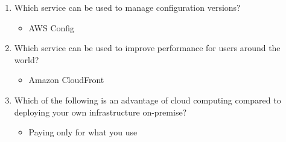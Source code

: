 \begin{enumerate}
	\item Which service can be used to manage configuration versions?

	\begin{itemize}
	\item AWS Config
\end{itemize}

	\item Which service can be used to improve performance for users around the world?

	\begin{itemize}
	\item Amazon CloudFront
\end{itemize}

	\item Which of the following is an advantage of cloud computing compared to deploying your own infrastructure on-premise?

	\begin{itemize}
	\item Paying only for what you use
\end{itemize}

\end{enumerate}
